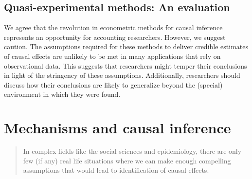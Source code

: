 \documentclass[12pt,reqno,titlepage]{amsart}
\begin{document}
\begin{doublespace}


\subsection{Quasi-experimental methods: An evaluation}
We agree that the revolution in econometric methods for causal inference represents an opportunity for accounting researchers.
However, we suggest caution. 
The assumptions required for these methods to deliver credible estimates of causal effects are unlikely to be met in many applications that rely on observational data. 
This suggests that researchers might temper their conclusions in light of the stringency of these assumptions.
Additionally, researchers should discuss how their conclusions are likely to generalize beyond the (special) environment in which they were found.

\section{Mechanisms and causal inference} \label{sec:mech}

\begin{quotation}
\begin{singlespace} 
	\addtolength{\leftmargin}{.25in}
	\addtolength{\rightmargin}{.25in}
In complex fields like the social sciences and epidemiology, there are only few (if any) real life situations where we can make enough compelling assumptions that would lead to identification of causal effects.
\end{singlespace}
\end{quotation}


\end{doublespace}
\end{document}
